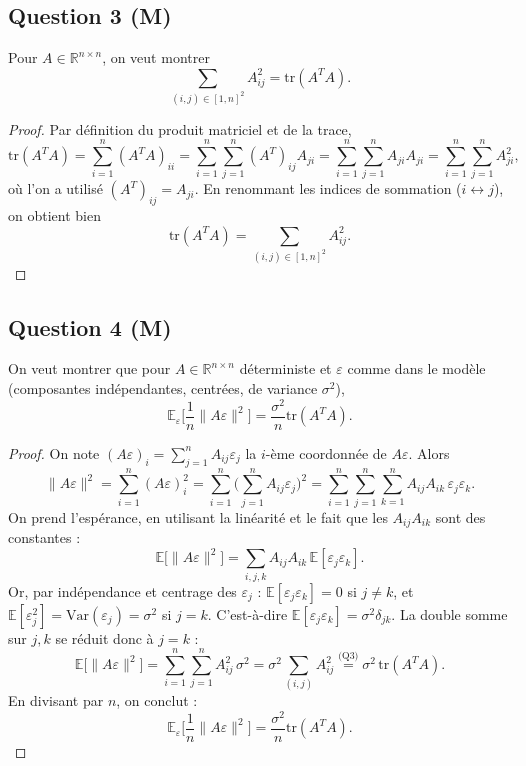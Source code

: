 \documentclass[11pt]{article}
\theoremstyle{remark}
\newcommand{\E}{\mathbb{E}}
\newcommand{\R}{\mathbb{R}}
\newcommand{\Var}{\mathrm{Var}}
\newcommand{\tr}{\mathrm{tr}}
\begin{document}
\subsection*{Question 3 (M)}

Pour $A \in \R^{n\times n}$, on veut montrer
\[
  \sum_{(i,j)\in[1,n]^2} A_{ij}^2 = \tr(A^TA).
\]

\begin{proof}
Par définition du produit matriciel et de la trace,
\[
  \tr(A^TA) = \sum_{i=1}^n (A^TA)_{ii} = \sum_{i=1}^n \sum_{j=1}^n (A^T)_{ij}A_{ji} = \sum_{i=1}^n\sum_{j=1}^n A_{ji}A_{ji} = \sum_{i=1}^n\sum_{j=1}^n A_{ji}^2,
\]
où l'on a utilisé $(A^T)_{ij} = A_{ji}$. En renommant les indices de sommation ($i\leftrightarrow j$), on obtient bien
\[
  \tr(A^TA) = \sum_{(i,j)\in[1,n]^2} A_{ij}^2.
\]
\end{proof}

\subsection*{Question 4 (M)}

On veut montrer que pour $A \in \R^{n\times n}$ déterministe et $\varepsilon$ comme dans le modèle (composantes indépendantes, centrées, de variance $\sigma^2$),
\[
  \E_\varepsilon\Big[\frac1n\|A\varepsilon\|^2\Big] = \frac{\sigma^2}{n}\tr(A^TA).
\]

\begin{proof}
On note $(A\varepsilon)_i = \sum_{j=1}^n A_{ij}\varepsilon_j$ la $i$-ème coordonnée de $A\varepsilon$. Alors
\[
  \|A\varepsilon\|^2 = \sum_{i=1}^n (A\varepsilon)_i^2 = \sum_{i=1}^n\Big(\sum_{j=1}^n A_{ij}\varepsilon_j\Big)^2 = \sum_{i=1}^n \sum_{j=1}^n\sum_{k=1}^n A_{ij}A_{ik}\,\varepsilon_j\varepsilon_k.
\]
On prend l'espérance, en utilisant la linéarité et le fait que les $A_{ij}A_{ik}$ sont des constantes :
\[
  \E\big[\|A\varepsilon\|^2\big] = \sum_{i,j,k} A_{ij}A_{ik}\,\E[\varepsilon_j\varepsilon_k].
\]
Or, par indépendance et centrage des $\varepsilon_j$ : $\E[\varepsilon_j\varepsilon_k] = 0$ si $j\neq k$, et $\E[\varepsilon_j^2] = \Var(\varepsilon_j) = \sigma^2$ si $j=k$. C'est-à-dire $\E[\varepsilon_j\varepsilon_k] = \sigma^2 \delta_{jk}$. La double somme sur $j,k$ se réduit donc à $j=k$ :
\[
  \E\big[\|A\varepsilon\|^2\big] = \sum_{i=1}^n\sum_{j=1}^n A_{ij}^2\,\sigma^2 = \sigma^2 \sum_{(i,j)} A_{ij}^2 \overset{\text{(Q3)}}{=} \sigma^2\,\tr(A^TA).
\]
En divisant par $n$, on conclut :
\[
  \E_\varepsilon\Big[\frac1n\|A\varepsilon\|^2\Big] = \frac{\sigma^2}{n}\tr(A^TA).
\]
\end{proof}
\end{document}
